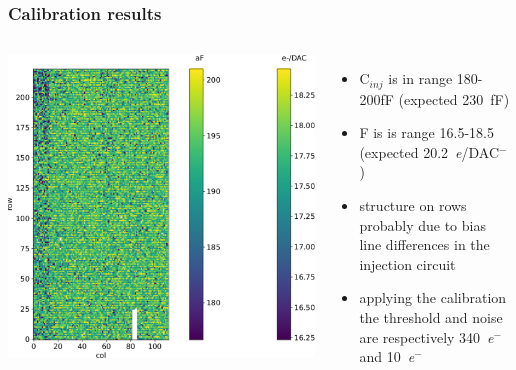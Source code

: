     \begin{frame}
        \frametitle{Calibration results}
        \begin{columns}
            \includegraphics[width=1.1\linewidth]{figures/charaterization/conversion_factor_map.pdf}
            \begin{itemize}
                \item C$_{inj}$ is in range 180-200\si{fF} (expected \SI{230}{fF})
                \item F is is range 16.5-18.5 (expected \SI{20.2}{\elementarycharge/DAC}$^-$)
                \item structure on rows probably due to bias line differences in the injection circuit 
                \item applying the calibration the threshold and noise are respectively \SI{340}{\elementarycharge}$^-$ and \SI{10}{\elementarycharge}$^-$
            \end{itemize}
        \end{columns}
    \end{frame}


